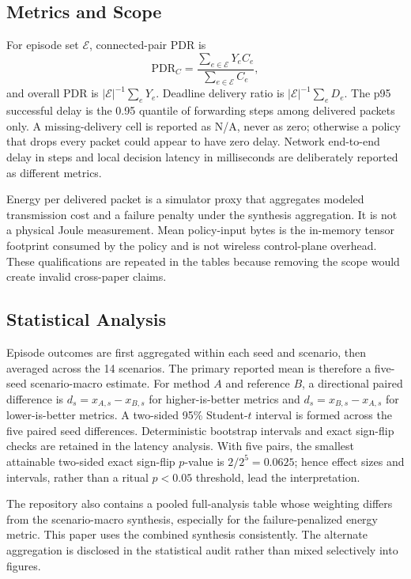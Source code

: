 \documentclass{ieeeaccess}
\newcommand{\pdr}{\mathrm{PDR}}
\begin{document}
\subsection{Metrics and Scope}

For episode set $\mathcal E$, connected-pair PDR is
\begin{equation}
\pdr_C=\frac{\sum_{e\in\mathcal E}Y_e C_e}{\sum_{e\in\mathcal E}C_e},
\end{equation}
and overall PDR is $|\mathcal E|^{-1}\sum_e Y_e$. Deadline delivery ratio is $|\mathcal E|^{-1}\sum_e D_e$. The p95 successful delay is the 0.95 quantile of forwarding steps among delivered packets only. A missing-delivery cell is reported as N/A, never as zero; otherwise a policy that drops every packet could appear to have zero delay. Network end-to-end delay in steps and local decision latency in milliseconds are deliberately reported as different metrics.

Energy per delivered packet is a simulator proxy that aggregates modeled transmission cost and a failure penalty under the synthesis aggregation. It is not a physical Joule measurement. Mean policy-input bytes is the in-memory tensor footprint consumed by the policy and is not wireless control-plane overhead. These qualifications are repeated in the tables because removing the scope would create invalid cross-paper claims.

\subsection{Statistical Analysis}

Episode outcomes are first aggregated within each seed and scenario, then averaged across the 14 scenarios. The primary reported mean is therefore a five-seed scenario-macro estimate. For method $A$ and reference $B$, a directional paired difference is $d_s=x_{A,s}-x_{B,s}$ for higher-is-better metrics and $d_s=x_{B,s}-x_{A,s}$ for lower-is-better metrics. A two-sided 95\% Student-$t$ interval is formed across the five paired seed differences. Deterministic bootstrap intervals and exact sign-flip checks are retained in the latency analysis. With five pairs, the smallest attainable two-sided exact sign-flip $p$-value is $2/2^5=0.0625$; hence effect sizes and intervals, rather than a ritual $p<0.05$ threshold, lead the interpretation.

The repository also contains a pooled full-analysis table whose weighting differs from the scenario-macro synthesis, especially for the failure-penalized energy metric. This paper uses the combined synthesis consistently. The alternate aggregation is disclosed in the statistical audit rather than mixed selectively into figures.
\end{document}
